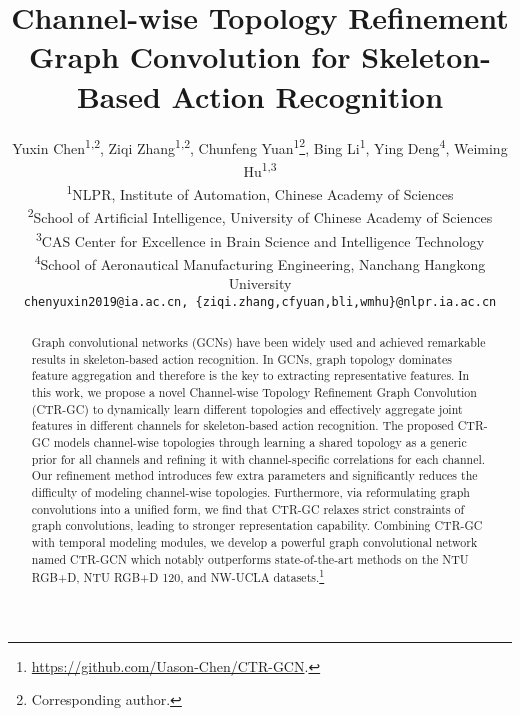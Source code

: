 \documentclass[10pt,twocolumn,letterpaper]{article}
\begin{document}
\title{Channel-wise Topology Refinement Graph Convolution for Skeleton-Based Action Recognition}

\author{Yuxin Chen\textsuperscript{1,2}, Ziqi Zhang\textsuperscript{1,2}, Chunfeng Yuan\textsuperscript{1}\thanks{Corresponding author.}, Bing Li\textsuperscript{1}, Ying Deng\textsuperscript{4}, Weiming Hu\textsuperscript{1,3}\\
\textsuperscript{1}NLPR, Institute of Automation, Chinese Academy of Sciences\\
\textsuperscript{2}School of Artificial Intelligence, University of Chinese Academy of Sciences\\
\textsuperscript{3}CAS Center for Excellence in Brain Science and Intelligence Technology\\
\textsuperscript{4}School of Aeronautical Manufacturing Engineering, Nanchang Hangkong University\\
{\tt\small chenyuxin2019@ia.ac.cn, \{ziqi.zhang,cfyuan,bli,wmhu\}@nlpr.ia.ac.cn}


}


\maketitle
\ificcvfinal\thispagestyle{empty}\fi

\begin{abstract}
   Graph convolutional networks (GCNs) have been widely used and achieved remarkable results in skeleton-based action recognition. In GCNs, graph topology dominates feature aggregation and therefore is the key to extracting representative features. In this work, we propose a novel Channel-wise Topology Refinement Graph Convolution (CTR-GC) to dynamically learn different topologies and effectively aggregate joint features in different channels for skeleton-based action recognition. The proposed CTR-GC models channel-wise topologies through learning a shared topology as a generic prior for all channels and refining it with channel-specific correlations for each channel. Our refinement method introduces few extra parameters and significantly reduces the difficulty of modeling channel-wise topologies. Furthermore, via reformulating graph convolutions into a unified form, we find that CTR-GC relaxes strict constraints of graph convolutions, leading to stronger representation capability. Combining CTR-GC with temporal modeling modules, we develop a powerful graph convolutional network named CTR-GCN which notably outperforms state-of-the-art methods on the NTU RGB+D, NTU RGB+D 120, and NW-UCLA datasets.\footnote{ \url{https://github.com/Uason-Chen/CTR-GCN}.}
\end{abstract}
\end{document}
